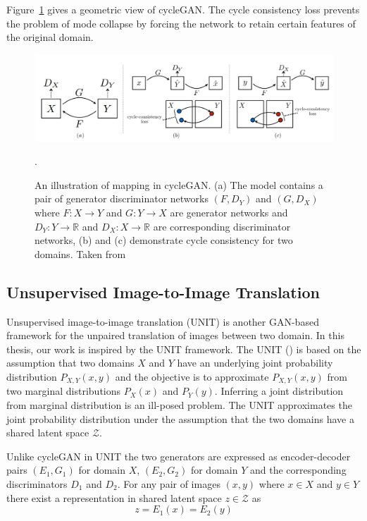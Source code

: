 Figure~\ref{fig:cycle_gan} gives a geometric view of cycleGAN. The cycle consistency loss prevents the problem of mode collapse by forcing the network to retain certain features of the original domain.

\begin{figure}
    \centering
    \includegraphics[width=0.95\columnwidth]{master_thesis_template/figs/cycle_gan.PNG}
    \caption[A geometric view of cycleGAN]{An illustration of mapping in cycleGAN. (a) The model contains a pair of generator discriminator networks $(F, D_Y)$ and $(G,D_X)$ where $F: X\rightarrow Y$ and $G: Y\rightarrow X$ are generator networks and $D_Y: Y\rightarrow \mathbb{R}$ and $D_X: X\rightarrow \mathbb{R}$ are corresponding discriminator networks, (b) and (c) demonstrate cycle consistency for two domains. Taken from~\cite{zhu2017unpaired}}.
    \label{fig:cycle_gan}
\end{figure}



\subsection{Unsupervised Image-to-Image Translation}
\label{subsec:unit_gan}
Unsupervised image-to-image translation (UNIT) is another GAN-based framework for the unpaired translation of images between two domain. In this thesis, our work is inspired by the UNIT framework. The UNIT (\cite{liu2017unsupervised}) is based on the assumption that two domains $X$ and $Y$ have an underlying joint probability distribution $P_{X,Y}(x,y)$ and the objective is to approximate $P_{X,Y}(x,y)$ from two marginal distributions $P_{X}(x)$ and $P_{Y}(y)$. Inferring a joint distribution from marginal distribution is an ill-posed problem. The UNIT approximates the joint probability distribution under the assumption that the two domains have a shared latent space $\mathcal{Z}$. 


Unlike cycleGAN in UNIT the two generators are expressed as encoder-decoder pairs $(E_1,G_1)$ for domain $X$, $(E_2,G_2)$ for domain $Y$ and the corresponding discriminators $D_1$ and $D_2$. For any pair of images $(x,y)$ where $x\in X$ and $y\in Y$ there exist a representation in shared latent space $z\in\mathcal{Z}$ as
\begin{equation}
    z = E_1(x) = E_2(y)
\end{equation}

